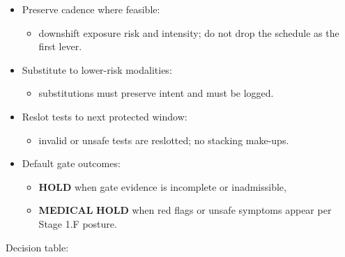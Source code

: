 \documentclass[10pt]{article}
\begin{document}
\begin{itemize}
\item Preserve cadence where feasible:
\begin{itemize}
\item downshift exposure risk and intensity; do not drop the schedule as the first lever.
\end{itemize}
\item Substitute to lower-risk modalities:
\begin{itemize}
\item substitutions must preserve intent and must be logged.
\end{itemize}
\item Reslot tests to next protected window:
\begin{itemize}
\item invalid or unsafe tests are reslotted; no stacking make-ups.
\end{itemize}
\item Default gate outcomes:
\begin{itemize}
\item \textbf{HOLD} when gate evidence is incomplete or inadmissible,
\item \textbf{MEDICAL} \textbf{HOLD} when red flags or unsafe symptoms appear per Stage 1.F posture.
\end{itemize}
\end{itemize}

Decision table:

\begingroup
\scriptsize
\setlength{\tabcolsep}{2pt}
\renewcommand{\arraystretch}{1.12}
\end{document}
